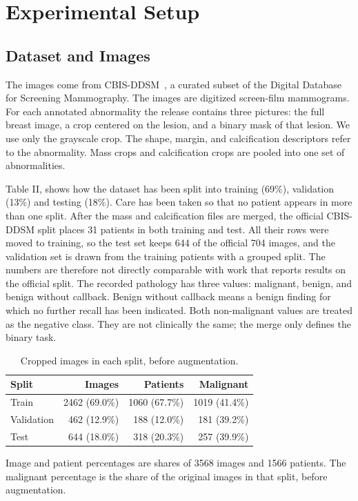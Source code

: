 \section{Experimental Setup}
\label{sec:experiments}

\subsection{Dataset and Images}
\label{sec:dataset}

The images come from CBIS-DDSM~\cite{lee2017cbis}, a curated subset of the Digital Database for Screening Mammography. The images are digitized screen-film mammograms. For each annotated abnormality the release contains three pictures: the full breast image, a crop centered on the lesion, and a binary mask of that lesion. We use only the grayscale crop. The shape, margin, and calcification descriptors refer to the abnormality. Mass crops and calcification crops are pooled into one set of abnormalities.

Table II, shows how the dataset has been split into training (69\%), validation (13\%) and testing (18\%). Care has been taken so that no patient appears in more than one split. After the mass and calcification files are merged, the official CBIS-DDSM split places 31 patients in both training and test. All their rows were moved to training, so the test set keeps 644 of the official 704 images, and the validation set is drawn from the training patients with a grouped split. The numbers are therefore not directly comparable with work that reports results on the official split. The recorded pathology has three values: malignant, benign, and benign without callback. Benign without callback means a benign finding for which no further recall has been indicated. Both non-malignant values are treated as the negative class. They are not clinically the same; the merge only defines the binary task. 



\begin{table}[!t]
\caption{Cropped images in each split, before augmentation.}
\label{tab:dataset}
\centering
\footnotesize
\setlength{\tabcolsep}{3.5pt}
\begin{tabular}{@{}lrrr@{}}
\toprule
Split & Images & Patients & Malignant \\
\midrule
Train & 2462 (69.0\%) & 1060 (67.7\%) & 1019 (41.4\%) \\
Validation & 462 (12.9\%) & 188 (12.0\%) & 181 (39.2\%) \\
Test & 644 (18.0\%) & 318 (20.3\%) & 257 (39.9\%) \\
\bottomrule
\end{tabular}

\vspace{0.4em}
\begin{minipage}{\columnwidth}
\footnotesize
Image and patient percentages are shares of 3568 images and 1566 patients. The malignant percentage is the share of the original images in that split, before augmentation.
\end{minipage}
\end{table}

